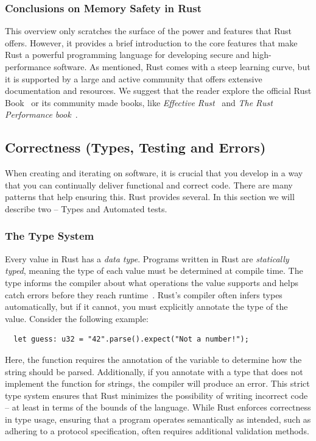 \documentclass[11pt]{report}
\theoremstyle{definition}
\theoremstyle{plain}
\begin{document}
\subsubsection{Conclusions on Memory Safety in Rust}
This overview only scratches the surface of the power and features that Rust offers. However, it provides a brief introduction to the core features that make Rust a powerful programming language for developing secure and high-performance software. As mentioned, Rust comes with a steep learning curve, but it is supported by a large and active community that offers extensive documentation and resources. We suggest that the reader explore the official Rust Book~\cite{rustlangRustProgramming} or its community made books, like \textit{Effective Rust}~\cite{lurklurkEffectiveRust} and \textit{The Rust Performance book}~\cite{rustlangPerformanceBook}.

\subsection{Correctness (Types, Testing and Errors)}
When creating and iterating on software, it is crucial that you develop in a way that you can continually deliver functional and correct code. There are many patterns that help ensuring this. Rust provides several. In this section we will describe two -- Types and Automated tests.

\subsubsection{The Type System}\label{sub:rusttypes}
Every value in Rust has a \textit{data type}. Programs written in Rust are \textit{statically typed}, meaning the type of each value must be determined at compile time. The type informs the compiler about what operations the value supports and helps catch errors before they reach runtime~\cite[ch.3.2]{rustlangRustProgramming}. Rust's compiler often infers types automatically, but if it cannot, you must explicitly annotate the type of the value. Consider the following example:

\begin{verbatim} 
  let guess: u32 = "42".parse().expect("Not a number!"); 
\end{verbatim}

Here, the  function requires the annotation of the variable  to determine how the string should be parsed. Additionally, if you annotate  with a type that does not implement the  function for strings, the compiler will produce an error. This strict type system ensures that Rust minimizes the possibility of writing incorrect code -- at least in terms of the bounds of the language. While Rust enforces correctness in type usage, ensuring that a program operates semantically as intended, such as adhering to a protocol specification, often requires additional validation methods.
\end{document}
